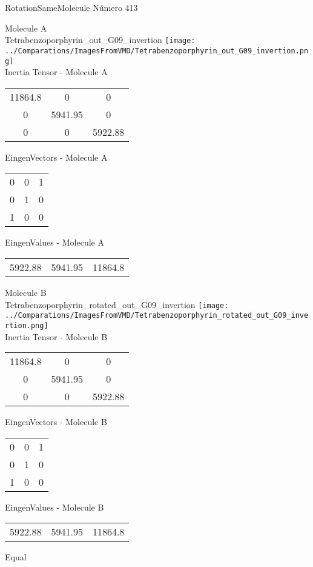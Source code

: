 \vtab[-2cm]
\begin{center}
{\large RotationSameMolecule \tab Número 413}
\end{center}
\begin{multicols}{2}
\begin{center}

Molecule A \\ 
Tetrabenzoporphyrin\_out\_G09\_invertion
\texttt{[image: ../Comparations/ImagesFromVMD/Tetrabenzoporphyrin\_out\_G09\_invertion.png]}
\\
Inertia Tensor - Molecule A \\
\vtab

\begin{tabular}{|c c c|}
11864.8	 & 	0	 & 	0	 \\
0	 & 	5941.95	 & 	0	 \\
0	 & 	0	 & 	5922.88
\end{tabular}

\vtab
 EingenVectors - Molecule A     \\
\vtab
\begin{tabular}{|c c c|}
0	 & 	0	 & 	1	 \\
0	 & 	1	 & 	0	 \\
1	 & 	0	 & 	0
\end{tabular}

\vtab
 EingenValues - Molecule A     \\
\vtab
\begin{tabular}{|c c c|}
5922.88	 & 	5941.95	 & 	11864.8	 \\
\end{tabular}
\columnbreak

Molecule B \\ 
Tetrabenzoporphyrin\_rotated\_out\_G09\_invertion
\texttt{[image: ../Comparations/ImagesFromVMD/Tetrabenzoporphyrin\_rotated\_out\_G09\_invertion.png]}
\\
Inertia Tensor - Molecule B \\
\vtab

\begin{tabular}{|c c c|}
11864.8	 & 	0	 & 	0	 \\
0	 & 	5941.95	 & 	0	 \\
0	 & 	0	 & 	5922.88
\end{tabular}

\vtab
 EingenVectors - Molecule B     \\
\vtab
\begin{tabular}{|c c c|}
0	 & 	0	 & 	1	 \\
0	 & 	1	 & 	0	 \\
1	 & 	0	 & 	0
\end{tabular}

\vtab
 EingenValues - Molecule B     \\
\vtab
\begin{tabular}{|c c c|}
5922.88	 & 	5941.95	 & 	11864.8	 \\
\end{tabular}

\end{center}
\end{multicols}
\begin{center}
\vtab
\vtab
\textcolor{NavyBlue}{\Large Equal}
\end{center}

